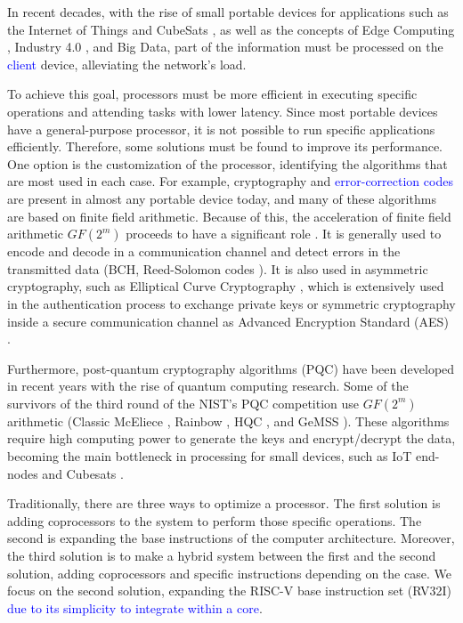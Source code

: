 In recent decades, with the rise of small portable devices for applications such as the Internet of Things \cite{5579543}
and CubeSats \cite{heidt2000cubesat}, as well as the concepts of Edge Computing \cite{7488250}, Industry 4.0 \cite{lasi2014industry}, 
and Big Data, part of the information must be processed on the \textcolor{blue}{client} device, alleviating the network's load.

To achieve this goal, processors must be more efficient in executing specific operations and attending tasks with lower latency. 
Since most portable devices have a general-purpose processor, it is not possible to run specific applications efficiently. 
Therefore, some solutions must be found to improve its performance. One option is the customization of the processor, 
identifying the algorithms that are most used in each case. For example, cryptography and 
\textcolor{blue}{error-correction codes} are present in almost any portable device today, and many of these algorithms are based on finite field arithmetic.  
Because of this, the acceleration of finite field arithmetic $GF(2^m)$ proceeds to have a significant role \cite{8192501}. 
It is generally used to encode and decode in a communication channel and detect errors in the transmitted data 
(BCH, Reed-Solomon codes \cite{wicker1999reed}). It is also used in asymmetric cryptography, such as Elliptical Curve Cryptography \cite{washington2008elliptic}, 
which is extensively used in the authentication process to exchange private keys or symmetric cryptography 
inside a secure communication channel as Advanced Encryption Standard (AES) \cite{heron2009advanced}.


Furthermore, post-quantum cryptography algorithms (PQC) \cite{8791343} have been developed in recent years 
with the rise of quantum computing research. Some of the survivors of the third round of the NIST's PQC competition \cite{moody2016post} 
use $GF(2^m)$ arithmetic (Classic McEliece \cite{bernstein2017classic}, Rainbow \cite{10.1007/11496137_12}, HQC \cite{melchor2018hamming}, and GeMSS \cite{casanova2017gemss}). 
These algorithms require high computing power to generate the keys and encrypt/decrypt the data, 
becoming the main bottleneck in processing for small devices, such as IoT end-nodes \cite{McGinthy2018} and Cubesats \cite{Maheshwarappa2017}.


Traditionally, there are three ways to optimize a processor. The first solution is adding coprocessors 
to the system to perform those specific operations. The second is expanding the base instructions 
of the computer architecture. Moreover, the third solution is to make a hybrid system \cite{4352011} between the first and 
the second solution, adding coprocessors and specific instructions depending on the case. 
We focus on the second solution, expanding the RISC-V base instruction set (RV32I) \textcolor{blue}{due to its simplicity to integrate within a core}. 


